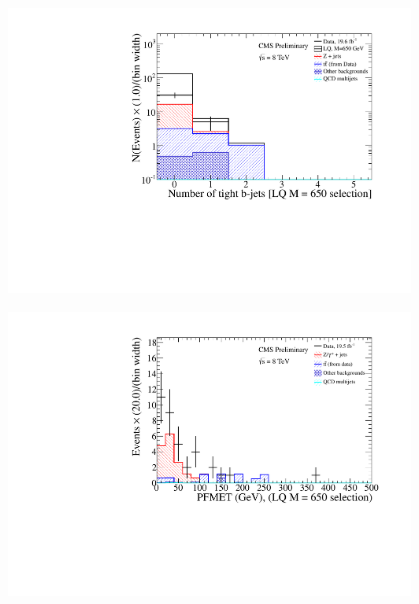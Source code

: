\documentclass[bigger]{beamer}
\begin{document}
\begin{frame}
\begin{columns}
\begin{column}{0.475\textwidth}
\includegraphics[width=0.8\textwidth]{fig/ee/extra/nBJet_tight_LQ650_eejj.pdf}
\label{sec-1-10-1-1-6}

\includegraphics[width=0.8\textwidth]{fig/ee/extra/MET_LQ650_eejj_finalOnly.pdf}
\end{column}
\end{columns}
\end{frame}
\end{document}
